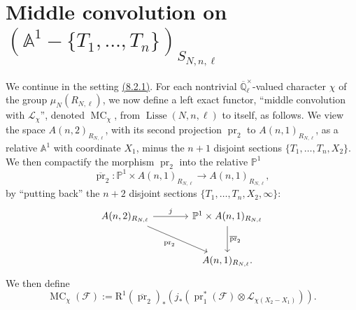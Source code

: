 \section[Middle convolution on the punctured affine line]{Middle convolution on \((\mathbb{A}^1-\{T_1,\ldots,T_n\})_{S_{N,n,\ell}}\)}
\label{sec:8.3}

We continue in the setting \hyperref[par:8.2.1]{(8.2.1)}. For each nontrivial \(\overline{\mathbb{Q}}_\ell^{\times}\)-valued character \(\chi\) of the group \(\mu_N(R_{N,\ell})\), we now define a left exact functor, ``middle convolution with \(\mathcal{L}_\chi\)'', denoted \(\operatorname{MC}_\chi\), from \(\operatorname{Lisse}(N,n,\ell)\) to itself, as follows. We view the space \(A(n,2)_{R_{N,\ell}}\), with its second projection \(\operatorname{pr}_2\) to \(A(n,1)_{R_{N,\ell}}\), as a relative \(\mathbb{A}^1\) with coordinate \(X_1\), minus the \(n+1\) disjoint sections \(\{T_1,\ldots,T_n,X_2\}\). We then compactify the morphism \(\operatorname{pr}_2\) into the relative \(\mathbb{P}^1\)
\[
\overline{\operatorname{pr}}_2:\mathbb{P}^1\times A(n,1)_{R_{N,\ell}}\to A(n,1)_{R_{N,\ell}},
\]
by ``putting back'' the \(n+2\) disjoint sections \(\{T_1,\ldots,T_n,X_2,\infty\}\):
\[
\begin{tikzcd}[column sep=large,row sep=large]
A(n,2)_{R_{N,\ell}} \arrow[r,"j"] \arrow[dr,"\operatorname{pr}_2"'] &
\mathbb{P}^1\times A(n,1)_{R_{N,\ell}} \arrow[d,"\overline{\operatorname{pr}}_2"]\\
& A(n,1)_{R_{N,\ell}}.
\end{tikzcd}
\]
We then define
\[
\operatorname{MC}_\chi(\mathcal{F}):=\mathrm{R}^1(\overline{\operatorname{pr}}_2)_*(j_*(\operatorname{pr}_1^*(\mathcal{F})\otimes\mathcal{L}_{\chi(X_2-X_1)})).
\]

